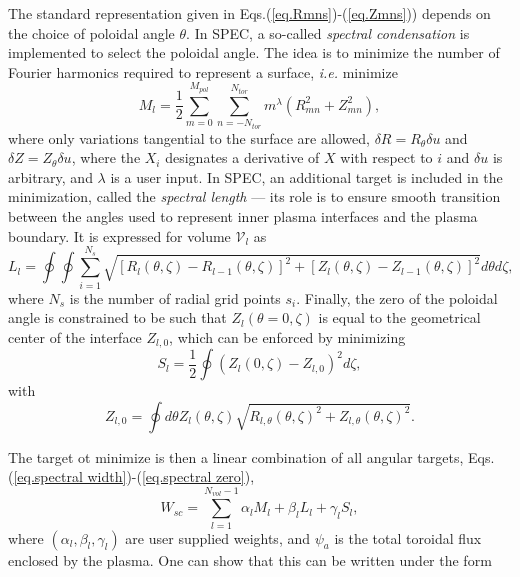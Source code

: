 The standard representation given in Eqs.(\ref{eq.Rmns})-(\ref{eq.Zmns})) depends on the choice of poloidal angle $\theta$. In SPEC, a so-called \emph{spectral condensation} \citep{Hirshman1986} is implemented to select the poloidal angle. The idea is to minimize the number of Fourier harmonics required to represent a surface, \textit{i.e.} minimize
\begin{equation}
	M_l = \frac{1}{2}\sum_{m=0}^{M_{pol}}\sum_{n=-N_{tor}}^{N_{tor}} m^\lambda (R_{mn}^2 + Z_{mn}^2), \label{eq.spectral width}
\end{equation}
where only variations tangential to the surface are allowed, $\delta R = R_\theta\delta u$ and $\delta Z = Z_\theta\delta u$, where the $X_i$ designates a derivative of $X$ with respect to $i$ and $\delta u$ is arbitrary, and $\lambda$ is a user input. In SPEC, an additional target is included in the minimization, called the \emph{spectral length} --- its role is to ensure smooth transition between the angles used to represent inner plasma interfaces and the plasma boundary. It is expressed for volume $\mathcal{V}_l$ as 
\begin{equation}
	L_l = \oint\oint\sum_{i=1}^{N_s}\sqrt{[R_l(\theta,\zeta)-R_{l-1}(\theta,\zeta)]^2 +  [Z_l(\theta,\zeta)-Z_{l-1}(\theta,\zeta)]^2}d\theta d\zeta, \label{eq.spectral length}
\end{equation}
where $N_s$ is the number of radial grid points $s_i$. Finally, the zero of the poloidal angle is constrained to be such that ${Z}_l(\theta=0,\zeta)$ is equal to the geometrical center of the interface $Z_{l,0}$, which can be enforced by minimizing
\begin{equation}
	S_l = \frac{1}{2}\oint ({Z}_l(0,\zeta) - Z_{l,0})^2 d\zeta, \label{eq.spectral zero}
\end{equation}
with
\begin{equation}
	Z_{l,0} = \oint d\theta Z_l(\theta,\zeta)\sqrt{R_{l,\theta}(\theta,\zeta)^2 + Z_{l,\theta}(\theta,\zeta)^2}.
\end{equation}

The target ot minimize is then a linear combination of all angular targets, Eqs.(\ref{eq.spectral width})-(\ref{eq.spectral zero}),
\begin{equation}
	W_{sc} = \sum_{l=1}^{N_{vol}-1} \alpha_lM_l + \beta_lL_l + \gamma_l S_l,
\end{equation}
where $(\alpha_l,\beta_l,\gamma_l)$ are user supplied weights, and $\psi_a$ is the total toroidal flux enclosed by the plasma. One can show that this can be written under the form


